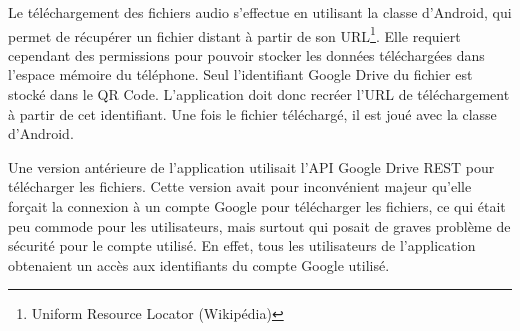 \par
Le téléchargement des fichiers audio s'effectue en utilisant la classe  d'Android, qui permet de récupérer un fichier distant à partir de son URL\footnote{Uniform Resource Locator (Wikipédia)}. Elle requiert cependant des permissions pour pouvoir stocker les données téléchargées dans l'espace mémoire du téléphone. Seul l'identifiant Google Drive du fichier est stocké dans le QR Code. L'application doit donc recréer l'URL de téléchargement	à partir de cet identifiant. Une fois le fichier téléchargé, il est joué avec la classe  d'Android.\\

\par
Une version antérieure de l'application utilisait l'API Google Drive REST pour télécharger les fichiers. Cette version avait pour inconvénient majeur qu'elle forçait la connexion à un compte Google pour télécharger les fichiers, ce qui était peu commode pour les utilisateurs, mais surtout qui posait de graves problème de sécurité pour le compte utilisé. En effet, tous les utilisateurs de l'application obtenaient un accès aux identifiants du compte Google utilisé.